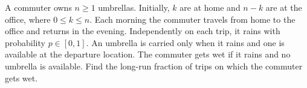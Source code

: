 A commuter owns $n\ge1$ umbrellas. Initially, $k$ are at home and $n-k$ are at the office, where $0\le k\le n$. Each morning the commuter travels from home to the office and returns in the evening. Independently on each trip, it rains with probability $p\in[0,1]$. An umbrella is carried only when it rains and one is available at the departure location. The commuter gets wet if it rains and no umbrella is available. Find the long-run fraction of trips on which the commuter gets wet.
